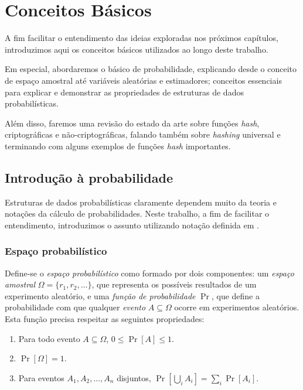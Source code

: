 \chapter{Conceitos Básicos}\label{cap:concepts}

A fim facilitar o entendimento das ideias exploradas nos próximos capítulos, introduzimos aqui os conceitos básicos utilizados ao longo deste trabalho.

Em especial, abordaremos o básico de probabilidade, explicando desde o conceito de espaço amostral até variáveis aleatórias e estimadores; conceitos essenciais para explicar e demonstrar as propriedades de estruturas de dados probabilísticas. 

Além disso, faremos uma revisão do estado da arte sobre funções \emph{hash}, criptográficas e não-criptográficas, falando também sobre \emph{hashing} universal e terminando com alguns exemplos de funções \emph{hash} importantes.

\section{Introdução à probabilidade}

Estruturas de dados probabilísticas claramente dependem muito da teoria e notações da cálculo de probabilidades. Neste trabalho, a fim de facilitar o entendimento, introduzimos o assunto utilizando notação definida em \cite{figueiredo2007randomizados}.

\subsection{Espaço probabilístico}

Define-se o \emph{espaço probabilístico} como formado por dois componentes: um \emph{espaço amostral} $\Omega = \{r_1, r_2, \ldots\}$, que representa os possíveis resultados de um experimento aleatório, e uma \emph{função de probabilidade} $\Pr$, que define a probabilidade com que qualquer \emph{evento} $A \subseteq \Omega$ ocorre em experimentos aleatórios. Esta função precisa respeitar as seguintes propriedades:

\begin{enumerate}
  \item Para todo evento $A \subseteq \Omega$, $0 \leq \Pr[A] \leq 1$.
  \item $\Pr[\Omega] = 1$.
  \item Para eventos $A_1, A_2, ..., A_n$ disjuntos, $\Pr[\bigcup_i A_i] = \sum_i \Pr[A_i]$.
\end{enumerate}

